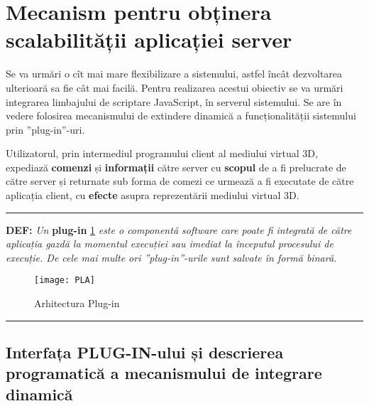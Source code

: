 \section{Mecanism pentru obținera \\ scalabilității aplicației server}

\par Se va urmări o cît mai mare flexibilizare a sistemului, astfel încât dezvoltarea ulterioară sa fie cât mai facilă. Pentru realizarea acestui obiectiv se va urmări integrarea limbajului de scriptare JavaScript, în serverul sistemului. Se are în vedere folosirea mecanismului de extindere dinamică a funcționalității sistemului prin ”plug-in”-uri. 
\par Utilizatorul, prin intermediul programului client al mediului virtual 3D, expediază \textbf{comenzi} și \textbf{informații} către server cu \textbf{scopul} de a fi prelucrate de către server și returnate sub forma de comezi ce urmează a fi executate de către aplicația client, cu \textbf{efecte} asupra reprezentării mediului virtual 3D.

\begin{center}
\rule{150mm}{.1pt}
\end{center}

\par \textbf{DEF:} \textit{Un} \textbf{plug-in} \ref{fig:imag35} \textit{este o componentă software care poate fi integrată de către aplicația gazdă la momentul execuției sau imediat la începutul procesului de execuție. De cele mai multe ori ”plug-in”-urile sunt salvate în formă binară.}

\begin{figure}[h]
    \centering
    \texttt{[image: PLA]}
    \caption{Arhitectura Plug-in}
    \label{fig:imag35}
\end{figure}

\begin{center}
\rule{150mm}{.1pt}
\end{center}

\subsection{Interfața PLUG-IN-ului și descrierea \\ programatică a mecanismului de integrare dinamică}
